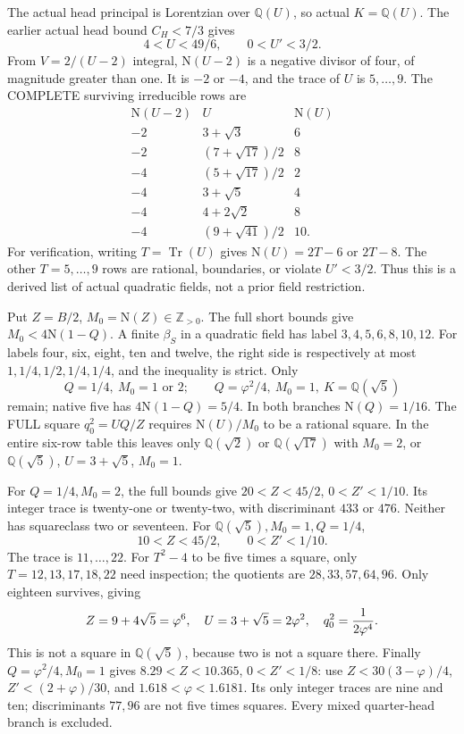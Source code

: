 The actual head principal is Lorentzian over \(\mathbb Q(U)\),
so actual \(K=\mathbb Q(U)\).
The earlier actual head bound \(C_H<7/3\) gives
\[
                   4<U<49/6,\qquad 0<U'<3/2 .
\]
From \(V=2/(U-2)\) integral,
\(\mathrm N(U-2)\) is a negative divisor of four,
of magnitude greater than one.
It is \(-2\) or \(-4\), and the trace of \(U\) is
\(5,\ldots,9\).
The COMPLETE surviving irreducible rows are
\[
\begin{array}{c|c|c}
 \mathrm N(U-2)&U&\mathrm N(U)\\ \hline
 -2&3+\sqrt3&6\\
 -2&(7+\sqrt{17})/2&8\\
 -4&(5+\sqrt{17})/2&2\\
 -4&3+\sqrt5&4\\
 -4&4+2\sqrt2&8\\
 -4&(9+\sqrt{41})/2&10 .
\end{array}
\]
For verification, writing \(T=\operatorname{Tr}(U)\)
gives \(\mathrm N(U)=2T-6\) or \(2T-8\).
The other \(T=5,\ldots,9\) rows are rational,
boundaries, or violate \(U'<3/2\).
Thus this is a derived list of actual quadratic
fields, not a prior field restriction.

Put \(Z=B/2\), \(M_0=\mathrm N(Z)\in\mathbb Z_{>0}\).
The full short bounds give \(M_0<4\mathrm N(1-Q)\).
A finite \(\beta_S\) in a quadratic field has
label \(3,4,5,6,8,10,12\).
For labels four, six, eight, ten and twelve, the
right side is respectively at most
\(1,1/4,1/2,1/4,1/4\), and the inequality is strict.
Only
\[
 Q=1/4,\ M_0=1\text{ or }2;\qquad
 Q=\varphi^2/4,\ M_0=1,\ K=\mathbb Q(\sqrt5)
\]
remain; native five has \(4\mathrm N(1-Q)=5/4\).
In both branches \(\mathrm N(Q)=1/16\).
The FULL square \(q_0^2=UQ/Z\) requires
\(\mathrm N(U)/M_0\) to be a rational square.
In the entire six-row table this leaves only
\(\mathbb Q(\sqrt2)\) or \(\mathbb Q(\sqrt{17})\)
with \(M_0=2\), or
\(\mathbb Q(\sqrt5)\), \(U=3+\sqrt5\), \(M_0=1\).

For \(Q=1/4,M_0=2\), the full bounds give
\(20<Z<45/2\), \(0<Z'<1/10\).
Its integer trace is twenty-one or twenty-two,
with discriminant \(433\) or \(476\).
Neither has squareclass two or seventeen.
For \(\mathbb Q(\sqrt5),M_0=1,Q=1/4\),
\[
                   10<Z<45/2,\qquad 0<Z'<1/10.
\]
The trace is \(11,\ldots,22\).
For \(T^2-4\) to be five times a square, only
\(T=12,13,17,18,22\) need inspection;
the quotients are \(28,33,57,64,96\).
Only eighteen survives, giving
\[
 Z=9+4\sqrt5=\varphi^6,\quad
 U=3+\sqrt5=2\varphi^2,\quad
 q_0^2={1\over2\varphi^4}.
\]
This is not a square in \(\mathbb Q(\sqrt5)\),
because two is not a square there.
Finally \(Q=\varphi^2/4,M_0=1\) gives
\(8.29<Z<10.365\), \(0<Z'<1/8\):
use \(Z<30(3-\varphi)/4\),
\(Z'<(2+\varphi)/30\), and
\(1.618<\varphi<1.6181\).
Its only integer traces are nine and ten;
discriminants \(77,96\) are not five times squares.
Every mixed quarter-head branch is excluded.

